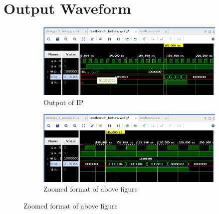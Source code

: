 \documentclass{article}
\begin{document}
\vspace{3cm}


\section{Output Waveform}
\vspace{1cm}
\begin{figure}[h]
\centering
\begin{subfigure}[b]{1.1\textwidth}
    \centering
\includegraphics[width=\textwidth]{figs/p1wavfull.png}
    \caption{Output of IP}
    \label{fig:my_label}
\end{subfigure}
\hfill
\begin{subfigure}[b]{1.1\textwidth}
    \centering
\includegraphics[width=\textwidth]{figs/p1wav.png}
    \caption{Zoomed format of above figure}
    \label{fig:my_label}
\end{subfigure}
\end{figure}
\vspace{13cm}
\end{document}
